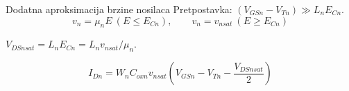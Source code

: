 \begin{frame}[label=09_1-s008]{Dodatna aproksimacija brzine nosilaca}\setlength{\parskip}{2pt}\setlength{\abovedisplayskip}{4pt}\setlength{\belowdisplayskip}{4pt}\setlength{\abovedisplayshortskip}{3pt}\setlength{\belowdisplayshortskip}{3pt}
Pretpostavka: $(V_{GSn}-V_{Tn})\gg L_nE_{Cn}$.\[v_n=\mu_nE\ (E\leq E_{Cn}),\qquad v_n=v_{nsat}\ (E\geq E_{Cn})\]
\par $V_{DSnsat}=L_nE_{Cn}=L_nv_{nsat}/\mu_n$.
\begin{center}\hspace{7mm}\hspace{7mm}\end{center}

\[I_{Dn}=W_nC_{oxn}v_{nsat}\left(V_{GSn}-V_{Tn}-\frac{V_{DSnsat}}2\right)\]

\end{frame}
